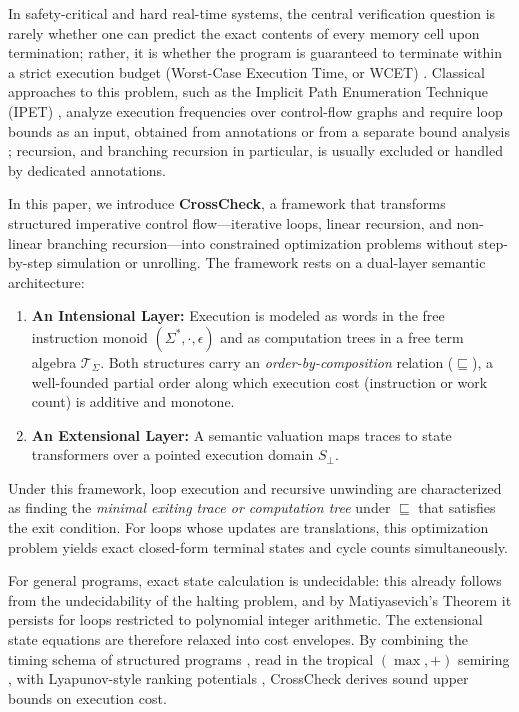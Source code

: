 \documentclass[oneside,english]{amsart}
\numberwithin{equation}{section}
\numberwithin{figure}{section}
\theoremstyle{plain}
\theoremstyle{definition}
\theoremstyle{plain}
\theoremstyle{remark}
\theoremstyle{plain}
\theoremstyle{definition}
\theoremstyle{plain}
\theoremstyle{remark}
\begin{document}
In safety-critical and hard real-time systems, the central verification question is rarely whether
one can predict the exact contents of every memory cell upon termination; rather, it is whether the
program is guaranteed to terminate within a strict execution budget
(Worst-Case Execution Time, or WCET) \cite{wilhelm2008worst}. Classical approaches to this problem,
such as the Implicit Path Enumeration Technique (IPET) \cite{li1995ilp}, analyze execution frequencies
over control-flow graphs and require loop bounds as an input, obtained from annotations or from a
separate bound analysis \cite{sinn2014complexity,alias2010multi}; recursion, and branching recursion
in particular, is usually excluded or handled by dedicated annotations.

In this paper, we introduce \textbf{CrossCheck}, a framework that transforms structured imperative control
flow---iterative loops, linear recursion, and non-linear branching recursion---into
constrained optimization problems without step-by-step simulation or unrolling.
The framework rests on a dual-layer semantic architecture:
\begin{enumerate}
    \item \textbf{An Intensional Layer:} Execution is modeled as words in the free instruction
    monoid $(\Sigma^*, \cdot, \epsilon)$ and as computation trees in a free term algebra $\mathcal{T}_\Sigma$.
    Both structures carry an \textit{order-by-composition} relation ($\sqsubseteq$), a well-founded partial
    order along which execution cost (instruction or work count) is additive and monotone.
    \item \textbf{An Extensional Layer:} A semantic valuation maps traces to state transformers
    over a pointed execution domain $S_\bot$.
\end{enumerate}

Under this framework, loop execution and recursive unwinding are characterized as finding the
\textit{minimal exiting trace or computation tree} under $\sqsubseteq$ that satisfies the
exit condition. For loops whose updates are translations, this optimization problem yields exact
closed-form terminal states and cycle counts simultaneously.

For general programs, exact state calculation is undecidable: this already follows from the
undecidability of the halting problem, and by Matiyasevich's Theorem \cite{matiyasevich1970enumerable}
it persists for loops restricted to polynomial integer arithmetic. The extensional state equations
are therefore relaxed into cost envelopes. By combining the timing schema of structured programs
\cite{shaw1989reasoning,puschner1989calculating}, read in the tropical $(\max, +)$ semiring \cite{baccelli1992synchronization},
with Lyapunov-style ranking potentials
\cite{floyd1967assigning,podelski2004transition}, CrossCheck derives sound upper bounds on execution cost.
\end{document}
